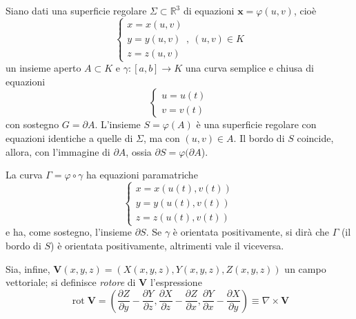 \documentclass[11pt, a4paper]{scrartcl}
\theoremstyle{definition}
\numberwithin{esempio}{section}
\theoremstyle{definition}
\numberwithin{obs}{section}
\numberwithin{nota}{section}
\numberwithin{equation}{subsection}
\begin{document}
Siano dati una superficie regolare $\Sigma \subset \mathbb{R}^3$ di equazioni $\mathbf{x}  = \varphi (u,v)$, cio\`e
\[
\begin{cases}
	x = x (u,v) \\
	y= y (u,v) \\
	z=  z(u,v)
\end{cases} , \ (u,v) \in K
\] 
un insieme aperto $A\subset K$ e $\gamma : \left[ a,b \right] \to K$ una curva semplice e chiusa di equazioni
\[
\begin{cases}
	u = u(t) \\ 
	v = v(t)
\end{cases}
\] 
con sostegno $G = \partial A$.
L'insieme $S = \varphi (A)$ \`e una superficie regolare con equazioni identiche a quelle di $\Sigma$, ma con $(u,v) \in A$.
Il bordo di $S$ coincide, allora, con l'immagine di $\partial A$, ossia $\partial S = \varphi (\partial A$).

La curva $\Gamma = \varphi  \circ \gamma$ ha equazioni paramatriche
\[
\begin{cases}
	x = x(u(t), v(t))\\
	y = y (u(t) , v(t))\\
	z = z(u(t), v(t)) 
\end{cases}
\] 
e ha, come sostegno, l'insieme $\partial S$.
Se $\gamma$ \`e orientata positivamente, si dir\`a che $\Gamma$ (il bordo di $S$) \`e orientata positivamente, altrimenti vale il viceversa.

Sia, infine, $\mathbf{V} (x,y,z) = (X (x,y,z) , Y(x,y,z) , Z(x,y,z))$ un campo vettoriale; si definisce \textit{rotore} di $\mathbf{V} $ l'espressione
\begin{equation}
\operatorname{rot} \mathbf{V}   = \left(\frac{\partial Z}{\partial y} - \frac{\partial Y}{\partial z} , \frac{\partial X}{\partial z} - \frac{\partial Z}{\partial x} , \frac{\partial Y}{\partial x} - \frac{\partial X}{\partial y} \right) \equiv \nabla \times \mathbf{V} 
\end{equation}
\end{document}
